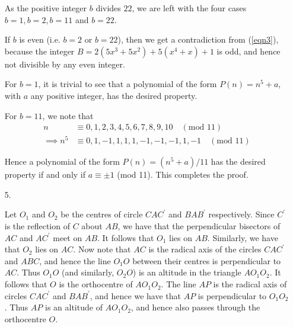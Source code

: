 \documentclass[a4paper, 12pt]{article}
\begin{document}
\begin{enumerate}
	As the positive integer $b$ divides $22$, we are left with the four cases $b = 1, b = 2, b = 11$ and $b = 22$.
	
    If $b$ is even (i.e. $b = 2$ or $b = 22$), then we get a contradiction from (\ref{eqn3}), because the integer $B = 2(5x^3 + 5x^2) + 5(x^4 + x) + 1$ is odd, and hence not divisible by any even integer.
    
    For $b = 1$, it is trivial to see that a polynomial of the form $P(n) = n^5 + a$, with $a$ any positive integer, has the desired property.
    
    For $b = 11$, we note that
    \begin{align*}
        n &\equiv 0, 1, 2, 3, 4, 5, 6, 7, 8, 9, 10 \quad (\textrm{mod } 11) \\
        \implies n^5 &\equiv 0, 1, -1, 1, 1, 1, -1, -1, -1, 1, -1 \quad (\textrm{mod } 11)
    \end{align*}
    
    Hence a polynomial of the form $P(n) = (n^5 + a)/11$ has the desired property if and only if $a \equiv \pm 1$ (mod 11). This completes the proof.
	
	\item[5.] 

    Let $O_1$ and $O_2$ be the centres of circle $CAC^\prime$ and $BAB^\prime$
    respectively. Since $C^\prime$ is the reflection of $C$ about $AB$, we have
    that the perpendicular bisectors of $AC$ and $AC^\prime$ meet on $AB$. It
    follows that $O_1$ lies on $AB$. Similarly, we have that $O_2$ lies on $AC$.
    Now note that $AC$ is the radical axis of the circles $CAC^\prime$ and
    $ABC$, and hence the line $O_1 O$ between their centres is perpendicular to
    $AC$. Thus $O_1 O$ (and similarly, $O_2 O$) is an altitude in the triangle
    $AO_1 O_2$. It follows that $O$ is the orthocentre of $AO_1 O_2$. The line
    $AP$ is the radical axis of circles $CAC^\prime$ and $BAB^\prime$, and hence
    we have that $AP$ is perpendicular to $O_1 O_2$. Thus $AP$ is an altitude of
    $AO_1 O_2$, and hence also passes through the orthocentre $O$.
	
\end{enumerate}
\end{document}
